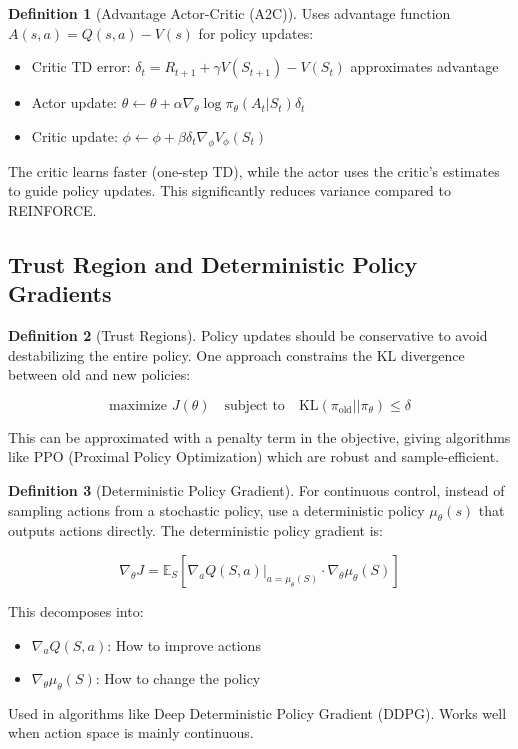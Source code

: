 \documentclass[12pt,a4paper]{article}
\theoremstyle{definition}
\newtheorem{definition}{Definition}[section]
\begin{document}
\begin{definition}[Advantage Actor-Critic (A2C)]
Uses advantage function $A(s, a) = Q(s, a) - V(s)$ for policy updates:

\begin{itemize}
    \item Critic TD error: $\delta_t = R_{t+1} + \gamma V(S_{t+1}) - V(S_t)$ approximates advantage
    \item Actor update: $\theta \leftarrow \theta + \alpha \nabla_\theta \log \pi_\theta(A_t|S_t) \delta_t$
    \item Critic update: $\phi \leftarrow \phi + \beta \delta_t \nabla_\phi V_\phi(S_t)$
\end{itemize}

The critic learns faster (one-step TD), while the actor uses the critic's estimates to guide policy updates. This significantly reduces variance compared to REINFORCE.
\end{definition}

\subsection{Trust Region and Deterministic Policy Gradients}

\begin{definition}[Trust Regions]
Policy updates should be conservative to avoid destabilizing the entire policy. One approach constrains the KL divergence between old and new policies:

\[
\text{maximize } J(\theta) \quad \text{subject to} \quad \text{KL}(\pi_{\text{old}} || \pi_\theta) \leq \delta
\]

This can be approximated with a penalty term in the objective, giving algorithms like PPO (Proximal Policy Optimization) which are robust and sample-efficient.
\end{definition}

\begin{definition}[Deterministic Policy Gradient]
For continuous control, instead of sampling actions from a stochastic policy, use a deterministic policy $\mu_\theta(s)$ that outputs actions directly. The deterministic policy gradient is:

\[
\nabla_\theta J = \mathbb{E}_S [\nabla_a Q(S, a)|_{a=\mu_\theta(S)} \cdot \nabla_\theta \mu_\theta(S)]
\]

This decomposes into:
\begin{itemize}
    \item $\nabla_a Q(S, a)$: How to improve actions
    \item $\nabla_\theta \mu_\theta(S)$: How to change the policy
\end{itemize}

Used in algorithms like Deep Deterministic Policy Gradient (DDPG). Works well when action space is mainly continuous.
\end{definition}
\end{document}
